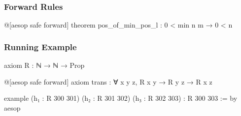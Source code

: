 \begin{frame}[fragile]
  \frametitle{Forward Rules}

  \begin{leancode}
    @[aesop safe forward]
    theorem pos_of_min_pos_l : 0 < min n m → 0 < n
  \end{leancode}

  \begin{tcolorbox}
    \begin{center}
    \end{center}
  \end{tcolorbox}
\end{frame}

\begin{frame}[fragile]
  \frametitle{Running Example}

  \begin{leancode}
    axiom R : ℕ → ℕ → Prop

    @[aesop safe forward]
    axiom trans : ∀ x y z, R x y → R y z → R x z

    example
        (h₁ : R 300 301)
        (h₂ : R 301 302)
        (h₃ : R 302 303) :
        R 300 303 := by
      aesop
  \end{leancode}
\end{frame}

